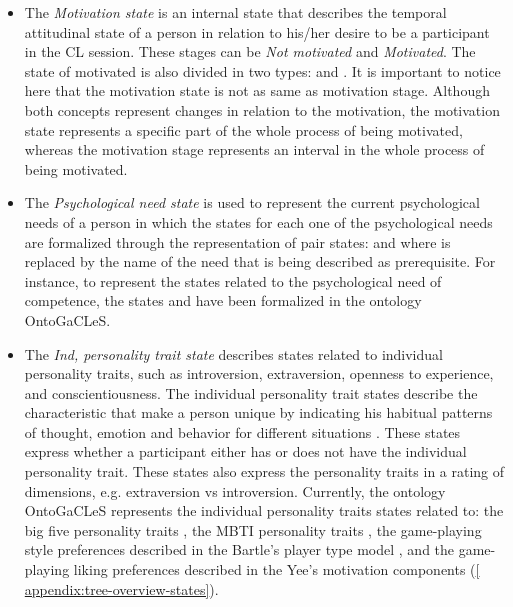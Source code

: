 \begin{itemize}
\item
The \emph{Motivation state} is an internal state that describes the temporal attitudinal state of a person in relation to his/her desire to be a participant in the CL session. These stages can be \emph{Not motivated} and \emph{Motivated}. The state of motivated is also divided in two types:  and  \cite{DeciRyan2010}. It is important to notice here that the motivation state is not as same as motivation stage. Although both concepts represent changes in relation to the motivation, the motivation state represents a specific part of the whole process of being motivated, whereas the motivation stage represents an interval in the whole process of being motivated.

\item
The \emph{Psychological need state} is used to represent the current psychological needs of a person in which the states for each one of the psychological needs are formalized through the representation of pair states:  and  where  is replaced by the name of the need that is being described as prerequisite. For instance, to represent the states related to the psychological need of competence, the states  and  have been formalized in the ontology OntoGaCLeS.

\item
The \emph{Ind, personality trait state} describes states related to individual personality traits, such as introversion, extraversion, openness to experience, and conscientiousness. The individual personality trait states describe the characteristic that make a person unique by indicating his habitual patterns of thought, emotion and behavior for different situations \cite{MatthewsDearyWhiteman2003}. These states express whether a participant either has or does not have the individual personality trait. These states also express the personality traits in a rating of dimensions, e.g. extraversion vs introversion. Currently, the ontology OntoGaCLeS represents the individual personality traits states related to: the big five personality traits \cite{CostaMacCrae1992}, the MBTI personality traits \cite{Briggs1976}, the game-playing style preferences described in the Bartle's player type model \cite{Bartle2004}, and the game-playing liking preferences described in the Yee's motivation components \cite{Yee2006} (\autoref{ appendix:tree-overview-states}).
\end{itemize}

